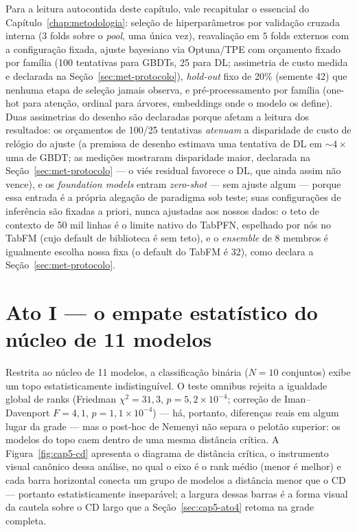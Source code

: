Para a leitura autocontida deste capítulo, vale recapitular o essencial
do Capítulo~\ref{chap:metodologia}: seleção de hiperparâmetros por
validação cruzada interna ($3$ folds sobre o \emph{pool}, uma única
vez), reavaliação em $5$ folds externos com a configuração fixada,
ajuste bayesiano via Optuna/TPE \citep{akiba2019}
com orçamento fixado por família (100 tentativas para GBDTs, 25 para
DL; assimetria de custo medida e declarada na Seção~\ref{sec:met-protocolo}), \emph{hold-out} fixo de 20\% (semente 42) que nenhuma etapa de seleção
jamais observa, e pré-processamento por família (one-hot para atenção,
ordinal para árvores, embeddings onde o modelo os define). Duas
assimetrias do desenho são declaradas porque afetam a leitura dos
resultados: os orçamentos de 100/25 tentativas \emph{atenuam} a
disparidade de custo de relógio do ajuste (a premissa de desenho
estimava uma tentativa de DL em ${\sim}4\times$ uma de GBDT; as
medições mostraram disparidade maior, declarada na
Seção~\ref{sec:met-protocolo} --- o viés residual favorece o DL, que
ainda assim não vence), e os \emph{foundation models} entram
\emph{zero-shot} --- sem ajuste algum --- porque essa entrada é a
própria alegação de paradigma sob teste; suas configurações de
inferência são fixadas a priori, nunca ajustadas aos nossos dados: o
teto de contexto de 50 mil linhas é o limite nativo do TabPFN,
espelhado por nós no TabFM (cujo default de biblioteca é sem teto), e o
\emph{ensemble} de 8 membros é igualmente escolha nossa fixa (o default
do TabFM é 32), como declara a Seção~\ref{sec:met-protocolo}.

\section{Ato I --- o empate estatístico do núcleo de 11 modelos}
\label{sec:cap5-ato1}

Restrita ao núcleo de 11 modelos, a classificação binária ($N{=}10$
conjuntos) exibe um topo estatisticamente indistinguível. O teste
omnibus rejeita a igualdade global de ranks (Friedman
$\chi^2 = 31{,}3$, $p = 5{,}2\times10^{-4}$; correção de Iman--Davenport
$F = 4{,}1$, $p = 1{,}1\times10^{-4}$) --- há, portanto, diferenças reais
em algum lugar da grade --- mas o post-hoc de Nemenyi
\citep{demsar2006} não separa o pelotão superior: os modelos do topo
caem dentro de uma mesma distância crítica. A
Figura~\ref{fig:cap5-cd} apresenta o diagrama de distância crítica, o
instrumento visual canônico dessa análise, no qual o eixo é o rank médio
(menor é melhor) e cada barra horizontal conecta um grupo de modelos a
distância menor que o CD --- portanto estatisticamente inseparável; a
largura dessas barras é a forma visual da cautela sobre o CD largo
que a Seção~\ref{sec:cap5-ato4} retoma na grade completa.

